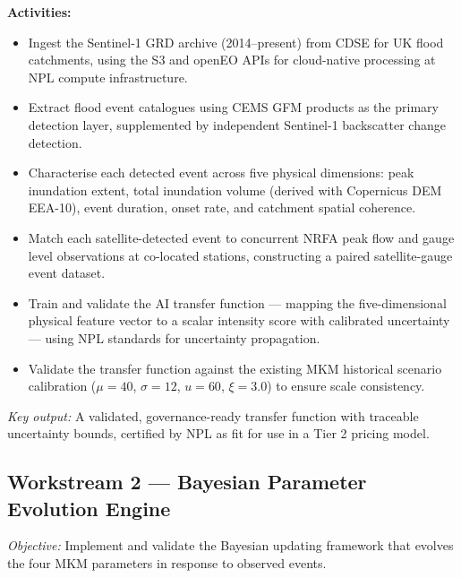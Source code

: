 \documentclass[11pt,a4paper]{article}
\begin{document}
\noindent\textbf{Activities:}
\begin{itemize}
  \item Ingest the Sentinel-1 GRD archive (2014--present) from CDSE for UK flood
  catchments, using the S3 and openEO APIs for cloud-native processing at NPL
  compute infrastructure.
  \item Extract flood event catalogues using CEMS GFM products as the primary
  detection layer, supplemented by independent Sentinel-1 backscatter change
  detection.
  \item Characterise each detected event across five physical dimensions: peak
  inundation extent, total inundation volume (derived with Copernicus DEM EEA-10),
  event duration, onset rate, and catchment spatial coherence.
  \item Match each satellite-detected event to concurrent NRFA peak flow and gauge
  level observations at co-located stations, constructing a paired satellite-gauge
  event dataset.
  \item Train and validate the AI transfer function --- mapping the
  five-dimensional physical feature vector to a scalar intensity score with
  calibrated uncertainty --- using NPL standards for uncertainty propagation.
  \item Validate the transfer function against the existing MKM historical scenario
  calibration ($\mu=40$, $\sigma=12$, $u=60$, $\xi=3.0$) to ensure scale
  consistency.
\end{itemize}

\textit{Key output:} A validated, governance-ready transfer function with traceable
uncertainty bounds, certified by NPL as fit for use in a Tier 2 pricing model.

\subsection{Workstream 2 --- Bayesian Parameter Evolution Engine}

\textit{Objective:} Implement and validate the Bayesian updating framework that
evolves the four MKM parameters in response to observed events.
\end{document}
